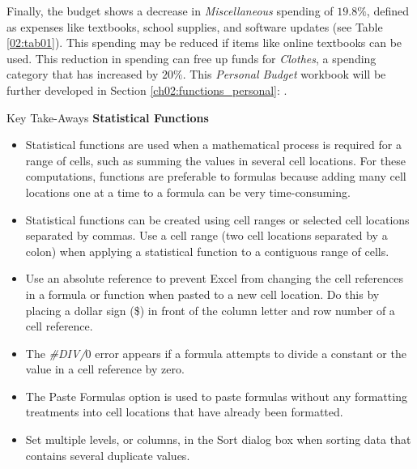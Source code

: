 Finally, the budget shows a decrease in \textit{Miscellaneous} spending of $ 19.8\% $, defined as expenses like textbooks, school supplies, and software updates (see Table \ref{02:tab01}). This spending may be reduced if items like online textbooks can be used. This reduction in spending can free up funds for \textit{Clothes}, a spending category that has increased by $ 20\% $. This \textit{Personal Budget} workbook will be further developed in Section \ref{ch02:functions_personal}: .

\begin{center}
	\begin{tkwbox}{Key Take-Aways}
		\textbf{Statistical Functions}
		\\
		\begin{itemize}
			\setlength{\itemsep}{0pt}
			\setlength{\parskip}{0pt}
			\setlength{\parsep}{0pt}
			
			\item Statistical functions are used when a mathematical process is required for a range of cells, such as summing the values in several cell locations. For these computations, functions are preferable to formulas because adding many cell locations one at a time to a formula can be very time-consuming.
			\item Statistical functions can be created using cell ranges or selected cell locations separated by commas. Use a cell range (two cell locations separated by a colon) when applying a statistical function to a contiguous range of cells.
			\item Use an absolute reference to prevent Excel from changing the cell references in a formula or function when pasted to a new cell location. Do this by placing a dollar sign (\$) in front of the column letter and row number of a cell reference.
			\item The \textit{\#DIV/$ 0 $} error appears if a formula attempts to divide a constant or the value in a cell reference by zero.
			\item The Paste Formulas option is used to paste formulas without any formatting treatments into cell locations that have already been formatted.
			\item Set multiple levels, or columns, in the Sort dialog box when sorting data that contains several duplicate values.
			
		\end{itemize}
	\end{tkwbox}
\end{center}

